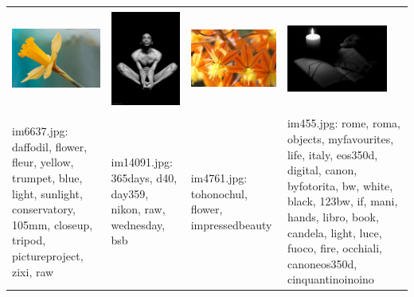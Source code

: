 \begin{tabular}{p{1.3in} p{1.3in} p{1.3in} p{1.3in} }
\includegraphics[keepaspectratio=false, height=1.3in, width=1.3in]{../datasets/mirflickr-test/im6637.jpg} & \includegraphics[keepaspectratio=false, height=1.3in, width=1.3in]{../datasets/mirflickr-training/im14091.jpg} & \includegraphics[keepaspectratio=false, height=1.3in, width=1.3in]{../datasets/mirflickr-training/im4761.jpg} & \includegraphics[keepaspectratio=false, height=1.3in, width=1.3in]{../datasets/mirflickr-training/im455.jpg}\\
im6637.jpg: daffodil, flower, fleur, yellow, trumpet, blue, light, sunlight, conservatory, 105mm, closeup, tripod, pictureproject, zixi, raw & im14091.jpg: 365days, d40, day359, nikon, raw, wednesday, bsb & im4761.jpg: tohonochul, flower, impressedbeauty & im455.jpg: rome, roma, objects, myfavourites, life, italy, eos350d, digital, canon, byfotorita, bw, white, black, 123bw, if, mani, hands, libro, book, candela, light, luce, fuoco, fire, occhiali, canoneos350d, cinquantinoinoino\\
\end{tabular}

